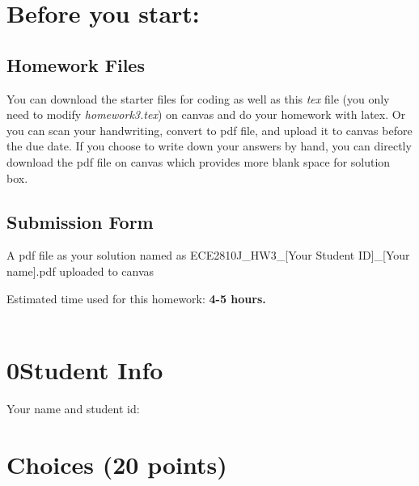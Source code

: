 \documentclass[11pt]{exam}
\begin{document}
\setlength{\parindent}{0pt}
\section*{Before you start:}

\subsection*{Homework Files}
You can download the starter files for coding as well as this \textit{tex} file (you only need to modify \textit{homework3.tex}) on canvas and do your homework with latex. Or you can scan your handwriting, convert to pdf file, and upload it to canvas before the due date. If you choose to write down your answers by hand, you can directly download the pdf file on canvas which provides more blank space for solution box.\\

\subsection*{Submission Form}
A pdf file as your solution named as ECE2810J\_HW3\_[Your Student ID]\_[Your name].pdf uploaded to canvas


Estimated time used for this homework: \textbf{4-5 hours.}
\\\\


\newpage
\section*{0\quad Student Info}
Your name and student id:
\begin{solution}
\end{solution}

\section{Choices (20 points)}
\end{document}
